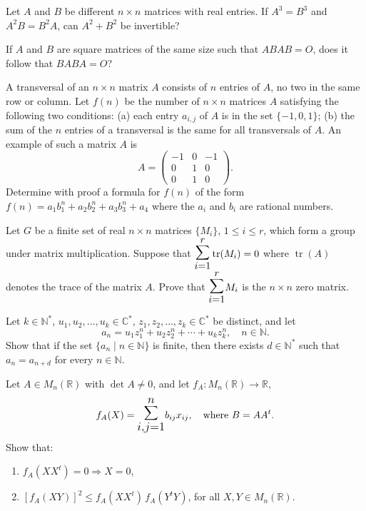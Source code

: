 \documentclass[12pt]{article}
\let\oldsum\sum
\renewcommand{\sum}{\mathlarger{\mathlarger{\oldsum}}}
\begin{document}
\begin{problem}
Let $A$ and $B$ be different $n\times n$ matrices with real entries. If $A^3=B^3$ and $A^2B=B^2A$, can $A^2+B^2$ be invertible?
\end{problem}

\begin{problem}
If $A$ and $B$ are square matrices of the same size such that $ABAB=O$, does it follow that $BABA=O$?
\end{problem}

\begin{problem}
A transversal of an $n\times n$ matrix $A$ consists of $n$ entries of $A$, no two in the same row or column. Let $f(n)$ be the number of $n\times n$ matrices $A$ satisfying the following two conditions: (a) each entry $a_{i,j}$ of $A$ is in the set $\{-1,0,1\}$; (b) the sum of the $n$ entries of a transversal is the same for all transversals of $A$. An example of such a matrix $A$ is
\[
A = \begin{pmatrix}-1 & 0 & -1\\ 0 & 1 & 0\\ 0 & 1 & 0\end{pmatrix}.
\]
Determine with proof a formula for $f(n)$ of the form $f(n) = a_1b_1^n + a_2b_2^n + a_3b_3^n + a_4$ where the $a_i$ and $b_i$ are rational numbers.
\end{problem}

\begin{problem}
Let $G$ be a finite set of real $n\times n$ matrices $\{M_i\}$, $1\le i\le r$, which form a group under matrix multiplication. Suppose that $\sum_{i=1}^r \operatorname{tr}(M_i) = 0$ where $\operatorname{tr}(A)$ denotes the trace of the matrix $A$. Prove that $\sum_{i=1}^r M_i$ is the $n\times n$ zero matrix.
\end{problem}

\begin{problem}
Let $k \in \mathbb{N}^*$, $u_1, u_2, \ldots, u_k \in \mathbb{C}^*$, $z_1, z_2, \ldots, z_k \in \mathbb{C}^*$ be distinct, and let
$$a_n = u_1 z_1^n + u_2 z_2^n + \cdots + u_k z_k^n, \quad n \in \mathbb{N}.$$
Show that if the set $\{a_n \mid n \in \mathbb{N}\}$ is finite, then there exists $d \in \mathbb{N}^*$ such that $a_n = a_{n+d}$ for every $n \in \mathbb{N}$.
\end{problem}

\begin{problem}
Let $A \in M_n(\mathbb{R})$ with $\det A \neq 0$, and let $f_A : M_n(\mathbb{R}) \to \mathbb{R}$,
$$f_A(X) = \sum_{i,j=1}^{n} b_{ij} x_{ij}, \quad \text{where } B = AA^t.$$
Show that:
\begin{enumerate}[label=(\alph*)]
\item $f_A(XX^t) = 0 \Rightarrow X = 0$,
\item $[f_A(XY)]^2 \le f_A(XX^t)\, f_A(Y^tY)$, for all $X, Y \in M_n(\mathbb{R})$.
\end{enumerate}
\end{problem}
\end{document}
